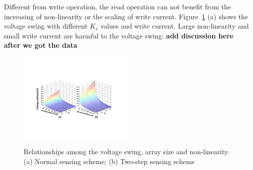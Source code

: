 Different from write operation, the read operation can not benefit from
the increasing of non-linearity or the scaling of write current.
Figure~\ref{fig:sense_margin} (a) shows the voltage swing with different
$K_r$ values and write current. Large non-linearity and small write
current are harmful to the voltage swing: \textbf{add discussion here
after we got the data}
\begin{figure}[!t]
\centering
  \includegraphics[width=0.5\textwidth]{./figures/sense_margin_f}\\
  \caption{Relationships among the voltage swing, array size and non-linearity. (a) Normal sensing scheme; (b) Two-step sensing scheme}\label{fig:sense_margin}
\end{figure}



